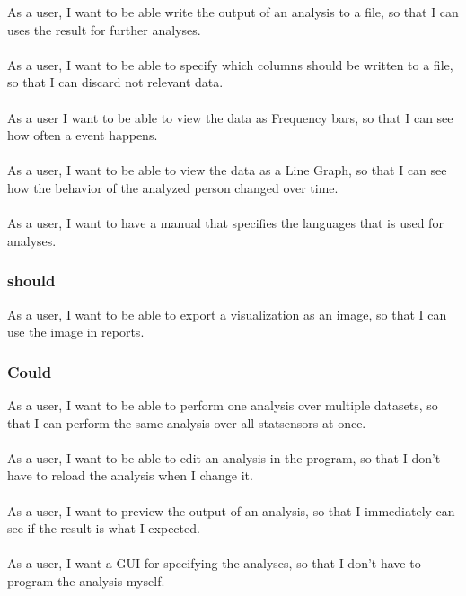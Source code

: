 As a user, I want to be able write the output of an analysis to a file, so that I can uses the result for further analyses.
\\\\
As a user, I want to be able to specify which columns should be written to a file, so that I can discard not relevant data.
\\\\
As a user I want to be able to view the data as Frequency bars, so that I can see how often a event happens.
\\\\
As a user, I want to be able to view the data as a Line Graph, so that I can see how the behavior of the analyzed person changed over time.
\\\\
As a user, I want to have a manual that specifies the languages that is used for analyses.

\subsubsection{should}
As a user, I want to be able to export a visualization as an image, so that I can use the image in reports.

\subsubsection{Could}
As a user, I want to be able to perform one analysis over multiple datasets, so that I can perform the same analysis over all statsensors at once.
\\\\
As a user, I want to be able to edit an analysis in the program, so that I don't have to reload the analysis when I change it.
\\\\
As a user, I want to preview the output of an analysis, so that I immediately can see if the result is what I expected.
\\\\
As a user, I want a GUI for specifying the analyses, so that I don't have to program the analysis myself.
